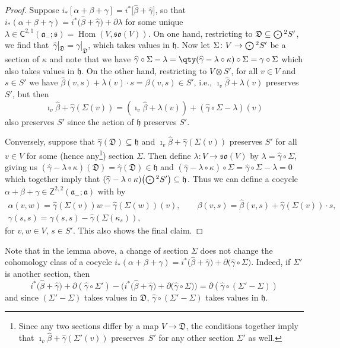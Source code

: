 \documentclass[10pt,a4paper]{amsart}
\numberwithin{equation}{section}
\newcommand{\fa}{\mathfrak{a}}
\newcommand{\fh}{\mathfrak{h}}
\newcommand{\fs}{\mathfrak{s}}
\newcommand{\fso}{\mathfrak{so}}
\newcommand{\fD}{\mathfrak{D}}
\newcommand{\ssC}{\mathsf{C}}
\newcommand{\ssZ}{\mathsf{Z}}
\newcommand{\betahat}{\widehat{\beta}}
\newcommand{\gammahat}{\widehat{\gamma}}
\newcommand{\Odot}{\mathchoice{{\textstyle\bigodot}}{\bigodot}{\bigodot}{\bigodot}}
\newcommand{\1}{\mathbbm{1}}
\DeclareMathOperator{\Hom}{Hom}
\begin{document}
\begin{proof}
	Suppose $i_*[\alpha+\beta+\gamma]=i^*\big[\betahat+\gammahat\big]$, so that $i_*(\alpha+\beta+\gamma)=i^*\bigl(\betahat+\gammahat\bigr)+\partial\lambda$ for some unique $\lambda\in\ssC^{2,1}(\fa_-;\fs)=\Hom(V,\fso(V))$. On one hand, restricting to $\fD\subseteq\Odot^2S'$, we find that~${\gammahat|_{\fD}=\gamma|_{\fD}}$, which takes values in $\fh$. Now let $\Sigma\colon V\to \Odot^2 S'$ be a section of $\kappa$ and note that we have
$\gammahat\circ\Sigma - \lambda
			= \qty(\gammahat - \lambda\circ\kappa)\circ\Sigma
			= \gamma\circ\Sigma
$
	which also takes values in $\fh$. On the other hand, restricting to $V\otimes S'$, for all $v\in V$ and $s\in S'$ we have $\betahat(v,s)+\lambda(v)\cdot s = \beta(v,s)\in S'$, i.e., $\imath_v\betahat+\lambda(v)$ preserves $S'$, but then
	\[
		\imath_v\betahat + \gammahat(\Sigma(v)) = (\imath_v\betahat + \lambda(v)) + (\gammahat\circ\Sigma-\lambda)(v)
	\]
	also preserves $S'$ since the action of $\fh$ preserves $S'$.
	
	Conversely, suppose that $\gammahat(\fD)\subseteq\fh$ and $\imath_v\betahat+\gammahat(\Sigma(v))$ preserves $S'$ for all $v\in V$ for some (hence any\footnote{Since any two sections differ by a map $V\to\fD$, the conditions together imply that $\imath_v\betahat+\gammahat(\Sigma'(v))$ preserves~$S'$ for any other section $\Sigma'$ as well.})
	section $\Sigma$. Then define $\lambda\colon V\to\fso(V)$ by $\lambda=\gammahat\circ\Sigma$, giving us $(\gammahat-\lambda\circ\kappa)(\fD)=\gammahat(\fD)\in\fh$ and $(\gammahat-\lambda\circ\kappa)\circ\Sigma=\gammahat\circ\Sigma-\lambda=0$ which together imply that $(\gammahat-\lambda\circ\kappa)\bigl(\Odot^2S'\bigr)\subseteq \fh$. Thus we can define a cocycle $\alpha+\beta+\gamma\in\ssZ^{2,2}(\fa_-;\fa)$ with \smash{$i_*[\alpha+\beta+\gamma]=i^*\big[\betahat+\gammahat\big]$} by
	\begin{gather*}%
		\alpha(v,w)	= \gammahat(\Sigma(v))w - \gammahat(\Sigma(w))(v),\qquad
		\beta(v,s)	= \betahat(v,s) + \gammahat(\Sigma(v))\cdot s,\\
		\gamma(s,s) = \gammahat(s,s) - \gammahat(\Sigma(\kappa_s)),
	\end{gather*}
	for $v,w\in V$, $s\in S'$. This also shows the final claim.
\end{proof}

Note that in the lemma above, a change of section $\Sigma$ does not change the cohomology class of a cocycle $i_*(\alpha+\beta+\gamma)=i^*\bigl(\betahat+\gammahat\bigr)+\partial\bigl(\gammahat\circ\Sigma\bigr)$. Indeed, if $\Sigma'$ is another section, then
\[
	i^*\bigl(\betahat+\gammahat\bigr)+\partial(\gammahat\circ\Sigma') - \bigl(i^*\bigl(\betahat+\gammahat\bigr)+\partial\bigl(\gammahat\circ\Sigma\bigr)\bigr)
	= \partial(\gammahat\circ(\Sigma'-\Sigma))
\]
and since $(\Sigma'-\Sigma)$ takes values in $\fD$, $\gammahat\circ(\Sigma'-\Sigma)$ takes values in $\fh$.
\end{document}
